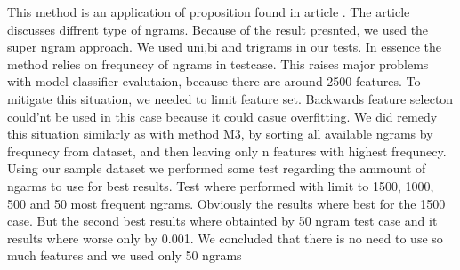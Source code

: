 This method is an application of proposition found in article \cite{kraaij2008}. The article discusses diffrent type of ngrams. Because of the result presnted, we used
the super ngram approach. We used uni,bi and trigrams in our tests.  In essence the method relies on frequnecy of ngrams in testcase. This raises major problems with model classifier 
evalutaion, because there are around 2500 features. To mitigate this situation, we needed to limit feature set. Backwards feature selecton could'nt be used in this case because it could casue overfitting. 
We did remedy this situation similarly as with method M3, by sorting all available ngrams by frequnecy from dataset, and then leaving only n features with highest frequnecy.  Using our sample
dataset we performed some test regarding the ammount of ngarms to use for best results.  Test where performed with limit to 1500, 1000, 500 and 50 most frequent ngrams.  
Obviously the results where best for the 1500 case. But the second best results where obtainted by 50 ngram test case and it results where worse only by 0.001. We concluded that there is 
no need to use so much features and we used only 50 ngrams